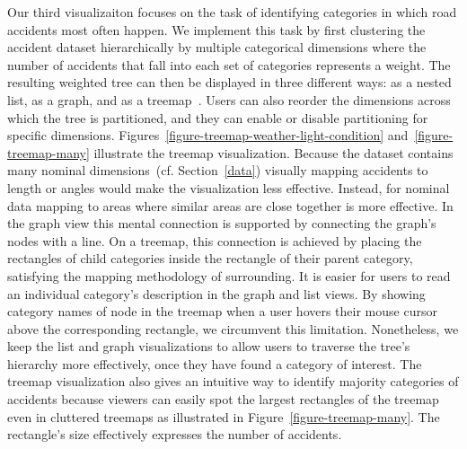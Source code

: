 Our third visualizaiton focuses on the task of identifying categories in which road accidents most often happen. We implement this task by first clustering the accident dataset hierarchically by multiple categorical dimensions where the number of accidents that fall into each set of categories represents a weight. The resulting weighted tree can then be displayed in three different ways: \Ni as a nested list, \Nii as a graph, and \Niii as a treemap~\cite{Shneiderman1992}.
Users can also reorder the dimensions across which the tree is partitioned, and they can enable or disable partitioning for specific dimensions.
Figures~\ref{figure-treemap-weather-light-condition} and~\ref{figure-treemap-many} illustrate the treemap visualization.
Because the dataset contains many nominal dimensions~(cf. Section~\ref{data}) visually mapping accidents to length or angles would make the visualization less effective. Instead, for nominal data mapping to areas where similar areas are close together is more effective.
In the graph view this mental connection is supported by connecting the graph's nodes with a line. On a treemap, this connection is achieved by placing the rectangles of child categories inside the rectangle of their parent category, satisfying the mapping methodology of surrounding.
It is easier for users to read an individual category's description in the graph and list views. By showing category names of node in the treemap when a user hovers their mouse cursor above the corresponding rectangle, we circumvent this limitation.
Nonetheless, we keep the list and graph visualizations to allow users to traverse the tree's hierarchy more effectively, once they have found a category of interest.
The treemap visualization also gives an intuitive way to identify majority categories of accidents because viewers can easily spot the largest rectangles of the treemap even in cluttered treemaps as illustrated in Figure~\ref{figure-treemap-many}. The rectangle's size effectively expresses the number of accidents.

